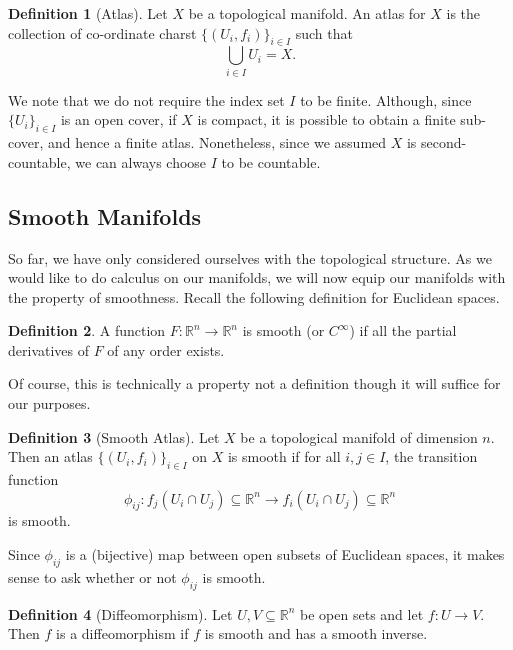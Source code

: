 \documentclass[]{article}
\theoremstyle{definition}
\theoremstyle{definition}
\newtheorem{definition}{Definition}[section]
\begin{document}
\begin{definition}[Atlas]
  Let \(X\) be a topological manifold. An atlas for \(X\) is the collection of
  co-ordinate charst \(\{(U_i, f_i)\}_{i \in I}\) such that 
  \[\bigcup_{i \in I} U_i = X.\]
\end{definition}

We note that we do not require the index set \(I\) to be finite. 
Although, since \(\{U_i\}_{i \in I}\) is an open cover, if \(X\) is compact, 
it is possible to obtain a finite sub-cover, and hence a finite atlas. Nonetheless, 
since we assumed \(X\) is second-countable, we can always choose \(I\) to be 
countable.

\subsection{Smooth Manifolds}

So far, we have only considered ourselves with the topological structure. As 
we would like to do calculus on our manifolds, we will now equip our manifolds 
with the property of smoothness. Recall the following definition for Euclidean 
spaces. 

\begin{definition}
  A function \(F : \mathbb{R}^n \to \mathbb{R}^n\) is smooth (or \(C^\infty\)) 
  if all the partial derivatives of \(F\) of any order exists.
\end{definition}

Of course, this is technically a property not a definition though it will suffice 
for our purposes.

\begin{definition}[Smooth Atlas]
  Let \(X\) be a topological manifold of dimension \(n\). Then an atlas 
  \(\{(U_i, f_i)\}_{i \in I}\) on \(X\) is smooth if for all \(i, j \in I\),
  the transition function 
  \[\phi_{ij} : f_j(U_i \cap U_j) \subseteq \mathbb{R}^n \to 
    f_i(U_i \cap U_j) \subseteq \mathbb{R}^n\]
  is smooth.
\end{definition}

Since \(\phi_{ij}\) is a (bijective) map between open subsets of Euclidean 
spaces, it makes sense to ask whether or not \(\phi_{ij}\) is smooth.

\begin{definition}[Diffeomorphism]
  Let \(U, V \subseteq \mathbb{R}^n\) be open sets and let \(f : U \to V\). 
  Then \(f\) is a diffeomorphism if \(f\) is smooth and has a smooth inverse.
\end{definition}
\end{document}
